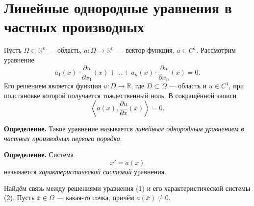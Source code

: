 
\setcounter{equation}{0}
\section{Линейные однородные уравнения в частных производных}
Пусть $\Omega \subset \mathbb R^n$ --- область, $a: \Omega \to \mathbb R^n$ --- вектор-функция, $a \in C^1$.
Рассмотрим уравнение
\begin{equation}
    a_1(x) \cdot \frac{\partial u}{\partial x_1}(x) + \dots + a_n(x) \cdot \frac{\partial u}{\partial x_n}(x) = 0.
\end{equation}
Его решением является функция $u: D \to \mathbb R$, где $D \subset \Omega$ --- область и $u \in C^1$, при подстановке которой получается тождественный ноль.
В сокращённой записи
\[
    \left< a(x), \frac{\partial u}{\partial x}(x) \right> = 0.
\]

\textbf{Определение.} Такое уравнение называется \textit{линейным однородным уравнением в частных производных первого порядка}.

\textbf{Определение.} Система
\begin{equation}
    x' = a(x)
\end{equation}
называется \textit{характеристической системой} уравнения.

Найдём связь между решениями уравнения (1) и его характеристической системы (2).
Пусть $\overline x \in \Omega$ --- какая-то точка, причём $a(\overline x) \ne 0$.

